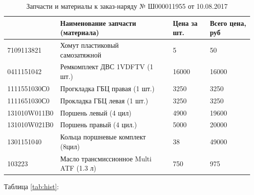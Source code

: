 %
%
 \begin{table}[H]
 	\centering
  	\caption{{\footnotesize Запчасти и материалы к заказ-наряду № Ш000011955 от 10.08.2017}}
 	\label{tab:4}
 	\begin{tabular}{|l|ll|l|l|}
 		\hline
 		\rowcolor[HTML]{C0C0C0} 
 		\multicolumn{1}{|c|}{\cellcolor[HTML]{C0C0C0}N кат} & Наименование запчасти (материала) & & Цена за шт. & Всего цена, руб \\ \hline
		7109113821    & Хомут пластиковый самозатяжной  & & 5      & 50      \\ \hline
	    \rowcolor[HTML]{EFEFEF} 
		0411151042    & Ремкомплект ДВС 1VDFTV (1 шт.)      & & 16000     & 16000    \\ \hline
		1111551030С0    & Прогкладка ГБЦ правая  (1 шт.)    & & 3250     & 3250      \\ \hline
		\rowcolor[HTML]{EFEFEF} 
		1111651030С0    & Прокладка ГБЦ левая (1 шт.) & & 3250     & 3250      \\ \hline
		131010W011B0    & Поршень левый (4 цил)      & & 4900     & 19600      \\ \hline
		\rowcolor[HTML]{EFEFEF} 
		131010W021B0   & Поршень правый (4 цил.)  & & 5000     & 20000      \\ \hline
		1301151040    & Кольца поршневые комплект (8цил)      & & 38     & 49000      \\ \hline
			\rowcolor[HTML]{EFEFEF} 
 		103223   & Масло трансмиссионное Multi ATF (1.3 л)     & & 750   & 975      \\ \hline
 		\end{tabular}
\end{table}





Таблица \ref*{tab:hist}:

